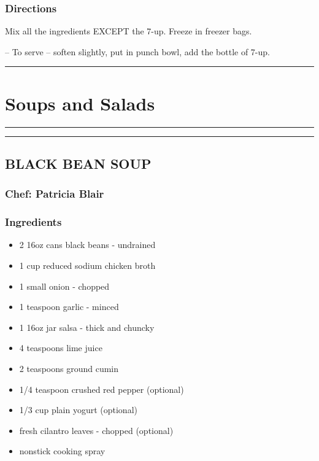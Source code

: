 \documentclass[
]{book}
\providecommand{\tightlist}{%
  \setlength{\itemsep}{0pt}\setlength{\parskip}{0pt}}
\begin{document}
\hypertarget{directions-12}{%
\subsection*{Directions}\label{directions-12}}


Mix all the ingredients EXCEPT the 7-up. Freeze in freezer bags.

-- To serve -- soften slightly, put in punch bowl, add the bottle of 7-up.

\begin{center}\rule{0.5\linewidth}{0.5pt}\end{center}

\hypertarget{salad}{%
\chapter{Soups and Salads}\label{salad}}

\begin{center}\rule{0.5\linewidth}{0.5pt}\end{center}

\begin{center}\rule{0.5\linewidth}{0.5pt}\end{center}

\hypertarget{black-bean-soup}{%
\section*{BLACK BEAN SOUP}\label{black-bean-soup}}


\hypertarget{chef-patricia-blair-5}{%
\subsection*{Chef: Patricia Blair}\label{chef-patricia-blair-5}}


\hypertarget{ingredients-13}{%
\subsection*{Ingredients}\label{ingredients-13}}


\begin{itemize}
\tightlist
\item
  2 16oz cans black beans - undrained
\item
  1 cup reduced sodium chicken broth
\item
  1 small onion - chopped
\item
  1 teaspoon garlic - minced
\item
  1 16oz jar salsa - thick and chuncky
\item
  4 teaspoons lime juice
\item
  2 teaspoons ground cumin
\item
  1/4 teaspoon crushed red pepper (optional)
\item
  1/3 cup plain yogurt (optional)
\item
  fresh cilantro leaves - chopped (optional)
\item
  nonstick cooking spray
\end{itemize}
\end{document}
